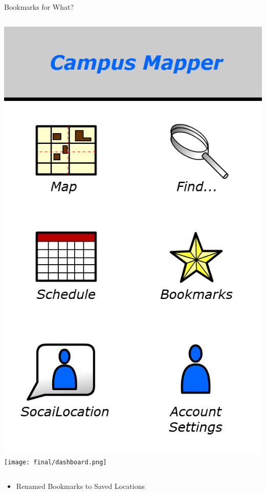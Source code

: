 \documentclass{beamer}
\begin{document}
\begin{frame}{Bookmarks for What?}
    \begin{columns}[c]
        \center\includegraphics[height=0.5 \textheight]{digital/dashboard.png}
        \center\texttt{[image: final/dashboard.png]}
    \end{columns}
    \begin{itemize}
        \item Renamed Bookmarks to Saved Locations
    \end{itemize}
\end{frame}
\end{document}
